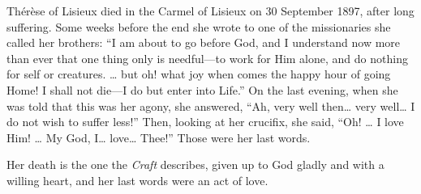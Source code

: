 Th\'er\`ese of Lisieux died in the Carmel of Lisieux on 30 September 1897, after long suffering. Some weeks before the end she wrote to one of the missionaries she called her brothers: ``I am about to go before God, and I understand now more than ever that one thing only is needful---to work for Him alone, and do nothing for self or creatures. \ldots{} but oh! what joy when comes the happy hour of going Home! I shall not die---I do but enter into Life.'' On the last evening, when she was told that this was her agony, she answered, ``Ah, very well then\ldots{} very well\ldots{} I do not wish to suffer less!'' Then, looking at her crucifix, she said, ``Oh! \ldots{} I love Him! \ldots{} My God, I\ldots{} love\ldots{} Thee!'' Those were her last words.

Her death is the one the \emph{Craft} describes, given up to God gladly and with a willing heart, and her last words were an act of love.
